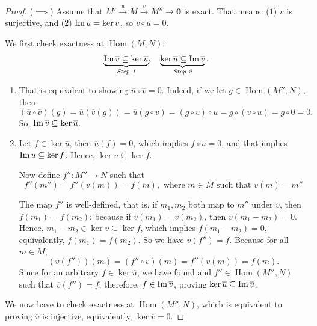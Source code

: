\begin{proof}
    (\(\implies\)) Assume that \( M' \xrightarrow{u} M \xrightarrow{v} M'' \to \mathbf{0} \) is exact. That means: (\( 1 \))  \( v \) is surjective, and (\( 2 \)) \( \operatorname{Im} u  = \ker v \), so  \( v \circ u = 0 \).

    We first check exactness at  \( \operatorname{Hom}(M, N) \):
    \[
        \underbrace{\operatorname{Im} \overline{v} \subseteq \ker \overline{u}}_{\emph{Step 1}}, \quad \underbrace{\ker \overline{u} \subseteq \operatorname{Im} \overline{v}}_{\emph{Step 2}}.
    \]
    \begin{enumerate}[label=\emph{Step \arabic*}. , leftmargin=*]
        \item That is equivalent to showing \( \overline{u} \circ \overline{v} = 0 \). Indeed, if we let \( g \in \operatorname{Hom}(M'', N) \), then 
         \[
            (\overline{u} \circ \overline{v})(g) = \overline{u}(\overline{v}(g)) = \overline{u}(g \circ v) = (g \circ v) \circ u = g \circ (v \circ u) = g \circ 0 = 0.
        \]
        So, \( \operatorname{Im} \overline{v} \subseteq \ker \overline{u} \).
        \item Let \( f \in \ker \overline{u} \), then \( \overline{u} (f) = 0 \), which implies \( f \circ u = 0 \), and that implies  \( \operatorname{Im} u \subseteq \ker f \). Hence, \( \ker v \subseteq \ker f \).

        Now define \( f'': M'' \to N \) such that 
            \[
                f''(m'') = f''(v(m)) = f(m), \text{ where } m \in M \text{ such that } v(m) = m''
            \]

        The map \( f'' \) is well-defined, that is, if \( m_1, m_2 \) both map to \( m'' \) under  \( v \), then  \( f(m_1) = f(m_2) \); because if \( v(m_1) = v(m_2) \), then \( v(m_1 - m_2)  = 0 \). Hence, \( m_1 - m_2 \in \ker v \subseteq \ker f \), which implies \( f(m_1 - m_2) = 0 \), equivalently, \( f(m_1) = f(m_2) \).
        So we have \( \overline{v}(f'') = f \). Because for all \( m \in M \),
         \[
             (\overline{v}(f''))(m) = (f'' \circ v)(m) = f''(v(m)) = f(m).
        \]
        Since for an arbitrary \( f \in \ker \overline{u}\), we have found and \( f'' \in \operatorname{Hom}(M'', N) \) such that  \( \overline{v}(f'') = f \), therefore, \( f \in \operatorname{Im} \overline{v} \), proving \( \ker \overline{u} \subseteq \operatorname{Im} \overline{v}\).
    \end{enumerate}
    We now have to check exactness at \( \operatorname{Hom}(M'', N) \), which is equivalent to proving  \( \overline{v} \) is injective, equivalently, \( \ker \overline{v} = 0 \).


\end{proof}
